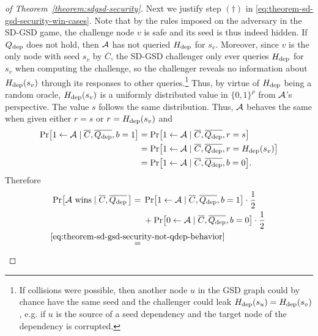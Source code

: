 \begin{proof}[of Theorem~\ref{theorem:sdgsd-security}]
	Next we justify step $(\dagger)$ in \eqref{eq:theorem-sd-gsd-security-win-cases}. Note that by the rules imposed on the adversary in the SD-GSD game, the challenge node $v$ is safe and its seed is thus indeed hidden. If $Q_\mathrm{dep}$ does not hold, then $\mathcal{A}$ has not queried $H_\mathrm{dep}$ for $s_v$. Moreover, since $v$ is the only node with seed $s_v$ by $\overline{C}$, the SD-GSD challenger only ever queries $H_\mathrm{dep}$ for $s_v$ when computing the challenge, so the challenger reveals no information about $H_\mathrm{dep}(s_v)$ through its responses to other queries.\footnote{If collisions were possible, then another node $u$ in the GSD graph could by chance have the same seed and the challenger could leak $H_\mathrm{dep}(s_u) = H_\mathrm{dep}(s_v)$, e.g. if $u$ is the source of a seed dependency and the target node of the dependency is corrupted.}
	Thus, by virtue of $H_\mathrm{dep}$ being a random oracle, $H_\mathrm{dep}(s_v)$ is a uniformly distributed value in $\{0, 1\}^\rho$ from $\mathcal{A}$'s perspective. The value $s$ follows the same distribution. Thus, $\mathcal{A}$ behaves the same when given either $r = s$ or $r = H_\mathrm{dep}(s_v)$ and
	\begin{align} \label{eq:theorem-sd-gsd-security-not-qdep-behavior}
		\begin{split}
			\pr{1 \from \adv \mid \overline{C}, \overline{\qdep}, b = 1} & = \pr{1 \from \adv \mid \overline{C}, \overline{\qdep}, r = s}          \\
			& = \pr{1 \from \adv \mid \overline{C}, \overline{\qdep}, r = \hdep(s_v)} \\
			& = \pr{1 \from \adv \mid \overline{C}, \overline{\qdep}, b = 0}.
		\end{split}
	\end{align}
	Therefore
	\begin{align*}
		\pr{\wins \mid \overline{C}, \overline{\qdep} \,} & = \begin{aligned}[t]
			                                                       & \pr{1 \from \adv \mid \overline{C}, \overline{\qdep}, b = 1} \cdot \frac{1}{2}   \\
			                                                       & + \pr{0 \from \adv \mid \overline{C}, \overline{\qdep}, b = 0} \cdot \frac{1}{2}
		                                                      \end{aligned}                                                                             \\
		                                                  & \stackrel{\mathclap{\eqref{eq:theorem-sd-gsd-security-not-qdep-behavior}}}{=} \begin{aligned}[t]

\end{aligned}
\end{align*}
\end{proof}

